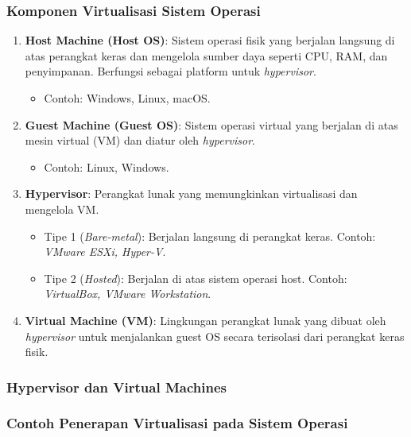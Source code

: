 \documentclass[12pt]{article}
\begin{document}
\subsubsection{Komponen Virtualisasi Sistem Operasi}
\begin{enumerate}
    \item \textbf{Host Machine (Host OS)}:
        Sistem operasi fisik yang berjalan langsung di atas perangkat keras dan mengelola sumber daya seperti CPU, RAM, dan penyimpanan. Berfungsi sebagai platform untuk \textit{hypervisor}.
    \begin{itemize}
        \item Contoh: Windows, Linux, macOS.
    \end{itemize}
    
    \item \textbf{Guest Machine (Guest OS)}:
        Sistem operasi virtual yang berjalan di atas mesin virtual (VM) dan diatur oleh \textit{hypervisor}. 
    \begin{itemize}
        \item Contoh: Linux, Windows.
    \end{itemize}
    
    \item \textbf{Hypervisor}:
    Perangkat lunak yang memungkinkan virtualisasi dan mengelola VM.
    \begin{itemize}
        \item Tipe 1 (\textit{Bare-metal}): Berjalan langsung di perangkat keras. Contoh: \textit{VMware ESXi, Hyper-V}.
        \item Tipe 2 (\textit{Hosted}): Berjalan di atas sistem operasi host. Contoh: \textit{VirtualBox, VMware Workstation}.
    \end{itemize}
    
    \item \textbf{Virtual Machine (VM)}:
    Lingkungan perangkat lunak yang dibuat oleh \textit{hypervisor} untuk menjalankan guest OS secara terisolasi dari perangkat keras fisik.
\end{enumerate}

\subsubsection{Hypervisor dan Virtual Machines}
\subsubsection{Contoh Penerapan Virtualisasi pada Sistem Operasi}
\end{document}
